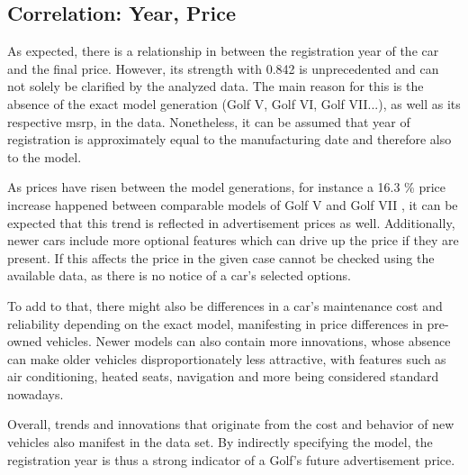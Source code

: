 \subsection{Correlation: Year, Price} \label{year_to_price_correlation}
As expected, there is a relationship in between the registration year of the car and the final price.
However, its strength with 0.842 is unprecedented and can not solely be clarified by the analyzed data.
The main reason for this is the absence of the exact model generation (Golf V, Golf VI, Golf VII...), as well as its respective \ac{msrp}, in the data.
Nonetheless, it can be assumed that year of registration is approximately equal to the manufacturing date and therefore also to the model.
\par
As prices have risen between the model generations, for instance a 16.3 \% price increase happened between comparable models of Golf V and Golf VII \autocite{DuelVWGolf},
it can be expected that this trend is reflected in advertisement prices as well.
Additionally, newer cars include more optional features which can drive up the price if they are present.
If this affects the price in the given case cannot be checked using the available data,
as there is no notice of a car's selected options.
\par
To add to that, there might also be differences in a car's maintenance cost and reliability depending on the exact model, manifesting in price differences in pre-owned vehicles.
Newer models can also contain more innovations, whose absence can make older vehicles  disproportionately less attractive, with features such as air conditioning, heated seats,
navigation and more being considered standard nowadays.
\par
Overall, trends and innovations that originate from the cost and behavior of new vehicles also manifest in the data set.
By indirectly specifying the model, the registration year is thus a strong indicator of a Golf's future advertisement price.
